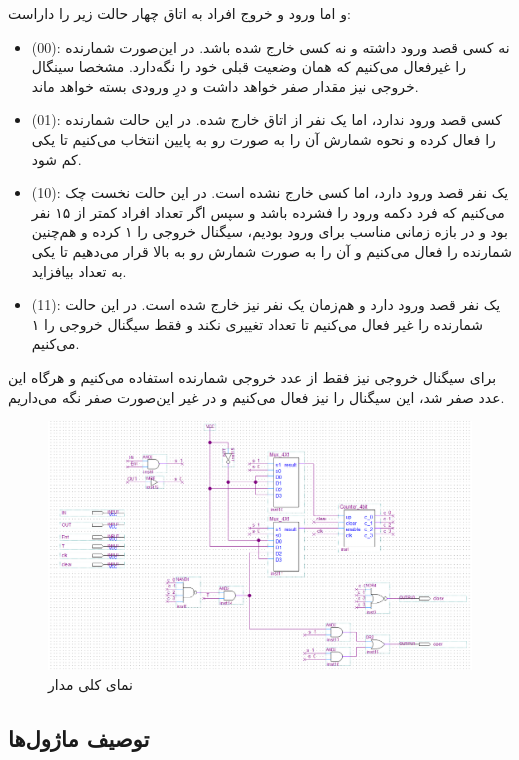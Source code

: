 \documentclass[12pt,onecolumn,a4paper,fleqn]{article}
\begin{document}
	و اما ورود و خروج افراد به اتاق چهار حالت زیر را داراست:
	\begin{itemize}
		\item (00): 
		نه کسی قصد ورود داشته و نه کسی خارج شده باشد. در این‌صورت شمارنده را غیرفعال می‌کنیم که همان وضعیت قبلی خود را نگه‌دارد. مشخصا سینگال خروجی
		نیز مقدار صفر خواهد داشت و درِ ورودی بسته خواهد ماند.
		\item (01):
		کسی قصد ورود ندارد، اما یک نفر از اتاق خارج شده. در این حالت شمارنده را فعال کرده و نحوه شمارش آن را به صورت رو به پایین انتخاب می‌کنیم تا یکی کم شود.
		\item (10):
		یک نفر قصد ورود دارد، اما کسی خارج نشده است. در این حالت نخست چک می‌کنیم که فرد دکمه ورود را فشرده باشد و سپس اگر تعداد افراد کمتر از ۱۵ نفر بود و در بازه زمانی مناسب برای ورود بودیم، سیگنال خروجی
		را ۱ کرده و هم‌چنین شمارنده را فعال می‌کنیم و آن را به صورت شمارش رو به بالا قرار می‌دهیم تا یکی به تعداد بیافزاید.
		\item (11):
		یک نفر قصد ورود دارد و هم‌زمان یک نفر نیز خارج شده است. در این حالت شمارنده را غیر فعال می‌کنیم تا تعداد تغییری نکند و فقط سیگنال خروجی
		را ۱ می‌کنیم.
	\end{itemize}
	برای سیگنال خروجی
	نیز فقط از عدد خروجی شمارنده استفاده می‌کنیم و هرگاه این عدد صفر شد، این سیگنال را نیز فعال می‌کنیم و در غیر این‌صورت صفر نگه می‌داریم.
	\begin{figure}[H]
		\centering
		\includegraphics[scale=0.6]{source/circuit.png}
		\caption{نمای کلی مدار}
		\label{fig:circuit}
	\end{figure}

	\subsection{توصیف ماژول‌ها}
\end{document}
